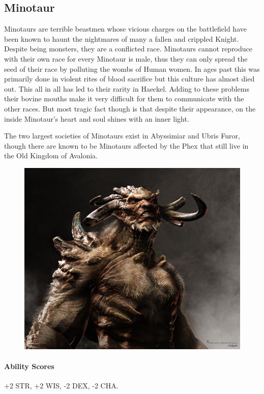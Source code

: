 \begin{multicols}{2}
\section{Minotaur}

Minotaurs are terrible beastmen whose vicious charges on the battlefield have been known to haunt the nightmares of many a fallen and crippled Knight. Despite being monsters, they are a conflicted race. Minotaurs cannot reproduce with their own race for every Minotaur is male, thus they can only spread the seed of their race by polluting the wombs of Human women. In ages past this was primarily done in violent rites of blood sacrifice but this culture has almost died out. This all in all has led to their rarity in Haeckel. Adding to these problems their bovine mouths make it very difficult for them to communicate with the other races. But most tragic fact though is that despite their appearance, on the inside Minotaur's heart and soul shines with an inner light.

The two largest societies of Minotaurs exist in Abyssimiar and Ubris Furor, though there are known to be Minotaurs affected by the Phex that still live in the Old Kingdom of Avalonia. 
 
\begin{figure}[h]
\includegraphics[width=\columnwidth]{Minotaur_sketch}
\end{figure}    
    \paragraph{Ability Scores} +2 STR, +2 WIS, -2 DEX, -2 CHA.

\end{multicols}

